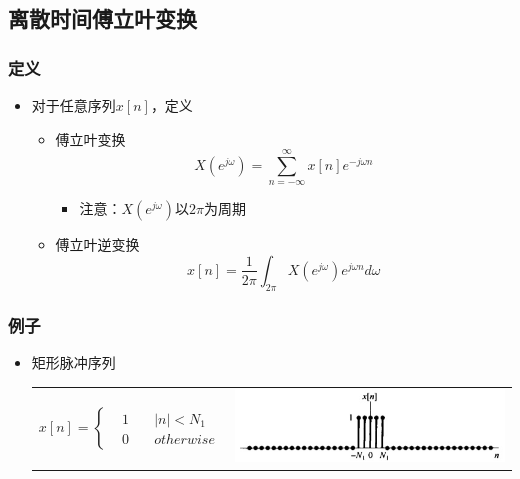 \documentclass[CJKutf8,xcolor=pdftex,dvipsnames,table]{beamer}
\begin{document}
\begin{CJK*}{UTF8}{song}
  \section{离散时间傅立叶变换}

  \begin{frame}
    \frametitle{定义}
    \begin{itemize}
    \item 对于任意序列$x[n]$，定义
    \begin{itemize}
    	\item 傅立叶变换
    	\[
			X(e^{j\omega}) = \sum_{n=-\infty}^{\infty}x[n]e^{-j\omega n}    
    	\]
			\begin{itemize}
			\item 注意：$X(e^{j\omega})$以$2\pi$为周期
			\end{itemize}	
    	\item 傅立叶逆变换
    	\[
			x[n] = \frac{1}{2\pi}\int_{2\pi}X(e^{j\omega})e^{j\omega n}d\omega    
    	\]
    	\end{itemize}
    \end{itemize}

  \end{frame}   
       
  \begin{frame}
    \frametitle{例子}
    \begin{itemize}
    \item 矩形脉冲序列 \\
	\begin{tabular}{ll}
	\raisebox{-.5\height}

    \begin{math}
x[n] = 
\left\{
    \begin {aligned}
         & 1 \quad & |n| < N_1 \\
         & 0 \quad & otherwise                  
    \end{aligned}
\right.
	\end{math}

&
    \includegraphics[valign=m,scale=.4]{ss-c-f5-6a}    \\
    \end{tabular} 
    

\end{itemize}
\end{frame}
\end{CJK*}
\end{document}
